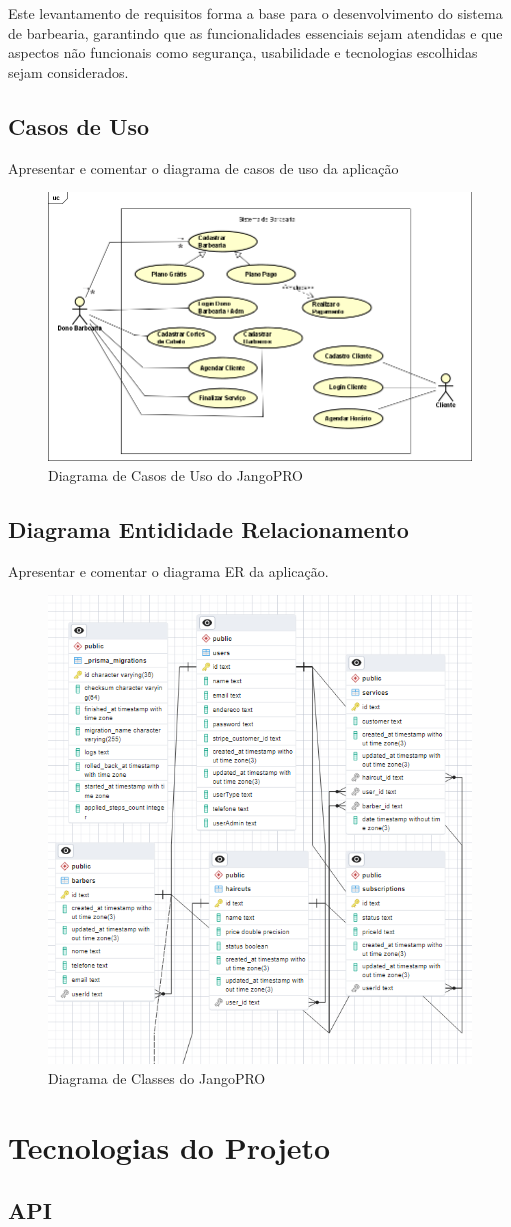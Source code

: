 \documentclass[12pt]{article}
\begin{document}
Este levantamento de requisitos forma a base para o desenvolvimento do sistema de barbearia, garantindo que as funcionalidades essenciais sejam atendidas e que aspectos não funcionais como segurança, usabilidade e tecnologias escolhidas sejam considerados.

\subsection{Casos de Uso}

Apresentar e comentar o diagrama de casos de uso da aplicação
\begin{figure}[h]
\centering
    \includegraphics[width=.3\textwidth]{imgs/Diagrama Casos de Uso JangoPRO.png}
    \caption{Diagrama de Casos de Uso do JangoPRO}
    \label{fig:casos-de-uso}
\end{figure}

\subsection{Diagrama Entididade Relacionamento}

Apresentar e comentar o diagrama ER da aplicação.

\begin{figure}[ht]
\centering
    \includegraphics[width=.3\textwidth]{imgs/Diagrama de Classes JangoPRO.png}
    \caption{Diagrama de Classes do JangoPRO}
    \label{fig:casos-de-classes}
\end{figure}

\section{Tecnologias do Projeto}

\subsection{API}
\end{document}
